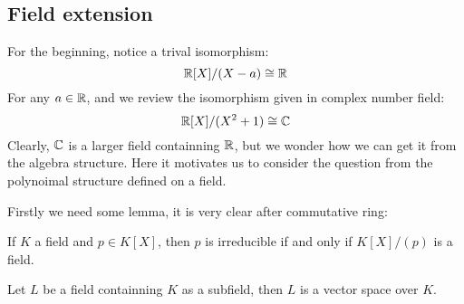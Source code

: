 \documentclass[en,geye,blue,normal,12pt]{elegantnote}
\begin{document}
\subsection{Field extension}
For the beginning, notice a trival isomorphism:
\[\mathbb{R}[X]/(X-a) \cong \mathbb{R} \]
For any \(a \in \mathbb{R}\), and we review the isomorphism given in complex number field:
\[ \mathbb{R}[X]/ (X^2+1) \cong \mathbb{C}\]
Clearly, \(\mathbb{C}\) is a larger field containning \(\mathbb{R}\), but we wonder how we can get it from the algebra structure. Here it motivates us to consider the question from the polynoimal structure defined on a field.

Firstly we need some lemma, it is very clear after commutative ring:
\begin{lemma} \label{irr iff field}
  If \(K\) a field and \(p \in K[X]\), then \(p\) is irreducible if and only if \(K[X]/(p)\) is a field.
\end{lemma}

\begin{lemma}
  Let \(L\) be a field containning \(K\) as a subfield, then \(L\) is a vector space over \(K\).
\end{lemma}
\end{document}
